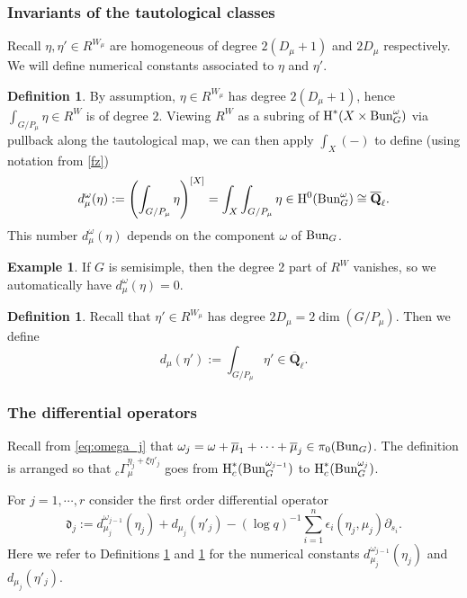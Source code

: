 \documentclass[reqno]{amsart}
\numberwithin{equation}{subsection}
\theoremstyle{definition}
\newtheorem{defn}[subsubsection]{Definition}
\newtheorem{exam}[subsubsection]{Example}
\newcommand\frd{\mathfrak{d}}
\newcommand{\Bun}{\textup{Bun}}
\newcommand{\Qlbar}{\overline{\Q}_\ell}
\newcommand{\ov}{\overline}
\newcommand{\cohog}[2]{\textup{H}^{#1}({#2})}     %
\newcommand{\cohoc}[2]{\textup{H}_{c}^{#1}({#2})}     %
\newcommand{\e}{\epsilon}
\newcommand{\y}{\eta}
\newcommand{\om}{\omega}
\newcommand\pl{\partial}
\newcommand{\Q}{\mathbf{Q}}
\newcommand{\rH}{\ensuremath{\mathrm{H}}\xspace}
\begin{document}
\subsubsection{Invariants of the tautological classes}\label{sssec:deg-of-taut}

Recall $\y, \y'\in R^{W_{\mu}}$ are homogeneous of degree $2(D_\mu+1)$ and $2D_\mu$ respectively.  We will define numerical constants associated to $\eta$ and $\eta'$. 

\begin{defn}\label{def: d eta}
By assumption, $\y\in R^{W_{\mu}}$ has degree $2(D_\mu+1)$, hence $\int_{G/P_{\mu}}\y\in R^{W}$ is of degree $2$. Viewing $R^{W}$ as a subring of $\cohog{*}{X\times \Bun_{G}^{\om}}$ via pullback along the tautological map, we can then apply $\int_{X}(-)$ to define (using notation from \eqref{fz})
\begin{equation*}
d^{\om}_{\mu}(\y):=\left(\int_{G/P_{\mu}}\y\right)^{[X]}=\int_{X}\int_{G/P_{\mu}}\y\in \rH^0(\Bun_G^\omega) \cong \Qlbar.
\end{equation*}
This number $d^{\om}_{\mu}(\y)$ depends on the component $\om$ of $\Bun_G$.  
\end{defn}

\begin{exam}\label{ex:semisimple-degrees}
If $G$ is semisimple, then the degree 2 part of $R^{W}$ vanishes, so we automatically have $d^{\om}_{\mu}(\y)=0$.
\end{exam}

\begin{defn} \label{def: d eta'}
Recall that $\y' \in R^{W_\mu}$ has degree $2 D_\mu = 2 \dim (G/P_\mu)$. Then we define
\begin{equation*}
d_{\mu}(\y'):=\int_{G/P_{\mu}}\y' \in \Qlbar.
\end{equation*}
\end{defn}



\subsubsection{The differential operators} Recall from \eqref{eq:omega_j} that 
$\om_{j}=\om+\ov \mu_{1}+\cdots+\ov \mu_{j}\in \pi_{0}(\Bun_{G})$. The definition is arranged so that ${}_{c}\Gamma^{\eta_j + \xi \eta'_j}_\mu$ goes from $\cohoc{*}{\Bun^{\om_{j-1}}_{G}}$ to $\cohoc{*}{\Bun^{\om_{j}}_{G}}$. 

For $j=1,\cdots, r$ consider the first order differential operator 
\begin{equation}\label{eq: split differential operator}
\frd_{j}:=d^{\om_{j-1}}_{\mu_j}(\y_{j}) + d_{ \mu_j}(\y'_{j})-(\log q)^{-1}\sum_{i=1}^{n}\e_{i}(\y_{j}, \mu_j)\pl_{s_{i}}.
\end{equation}Here we refer to Definitions \ref{def: d eta} and \ref{def: d eta'} for the numerical constants $d^{\om_{j-1}}_{\mu_j}(\y_{j}) $ and $ d_{\mu_j}(\y'_{j})$.
\end{document}
